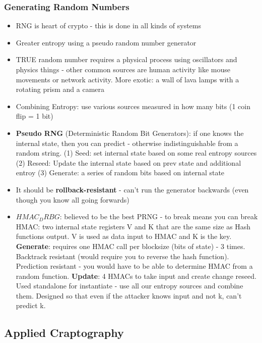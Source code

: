 \documentclass{article}
\begin{document}
\subsubsection{Generating Random Numbers}
\begin{itemize}
\item RNG is heart of crypto - this is done in all kinds of systems
\item Greater entropy using a pseudo random number generator
\item TRUE random number requires a physical process using oscillators and physics things - other common sources are human activity like mouse movements or network activity. More exotic: a wall of lava lamps with a rotating prism and a camera
\item Combining Entropy: use various sources measured in how many bits (1 coin flip = 1 bit)
\item \textbf{Pseudo RNG} (Deterministic Random Bit Generators): if one knows the internal state, then you can predict - otherwise indistinguishable from a random string. (1) Seed: set internal state based on some real entropy sources (2) Reseed: Update the internal state based on prev state and additional entroy (3) Generate: a series of random bits based on internal state
\item It should be \textbf{rollback-resistant} - can't run the generator backwards (even though you know all going forwards)
\item $HMAC_DRBG$: believed to be the best PRNG - to break means you can break HMAC: two internal state registers V and K that are the same size as Hash functions output. V is used as data input to HMAC and K is the key. \textbf{Generate}: requires one HMAC call per blocksize (bits of state) - 3 times. Backtrack resistant (would require you to reverse the hash function). Prediction resistant - you would have to be able to determine HMAC from a random function. \textbf{Update}: 4 HMACs to take input and create change reseed. Used standalone for instantiate - use all our entropy sources and combine them. Designed so that even if the attacker knows input and not k, can't predict k.
\end{itemize}
\subsection{Applied Craptography}
\end{document}
